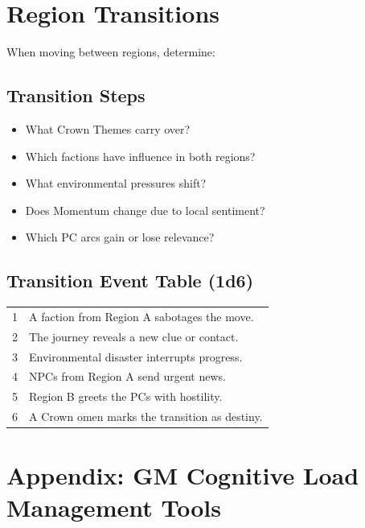 \documentclass[11pt]{article}
\begin{document}

\section{Region Transitions}
\label{appendix:region-transitions}

When moving between regions, determine:

\subsection{Transition Steps}

\begin{itemize}
    \item What Crown Themes carry over?
    \item Which factions have influence in both regions?
    \item What environmental pressures shift?
    \item Does Momentum change due to local sentiment?
    \item Which PC arcs gain or lose relevance?
\end{itemize}

\subsection{Transition Event Table (1d6)}

\begin{center}
\begin{longtable}{|c|p{11cm}|}
\hline
1 & A faction from Region A sabotages the move. \\
2 & The journey reveals a new clue or contact. \\
3 & Environmental disaster interrupts progress. \\
4 & NPCs from Region A send urgent news. \\
5 & Region B greets the PCs with hostility. \\
6 & A Crown omen marks the transition as destiny. \\
\hline
\end{longtable}
\end{center}

\section*{Appendix: GM Cognitive Load Management Tools}
\end{document}
